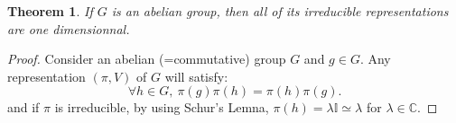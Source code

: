 \documentclass[11pt,a4paper]{article}
\newtheorem*{theorem}{Theorem}
\theoremstyle{definition}
\numberwithin{equation}{section}
\begin{document}
\begin{theorem}
    If $G$ is an abelian group, then all of its irreducible representations are one dimensionnal.
\end{theorem}
\begin{proof}
    Consider an abelian (=commutative) group $G$ and $g \in G$.
    Any representation $(\pi,V)$ of $G$ will satisfy:
    \begin{equation*}
       \forall h \in G,\  \pi(g) \pi(h) = \pi(h) \pi(g).
    \end{equation*}
and if $\pi$ is irreducible, by using Schur's Lemna, $\pi(h) = \lambda \mathbb{I} \simeq \lambda$ for $\lambda \in \mathbb{C}$.
\end{proof}
\end{document}
